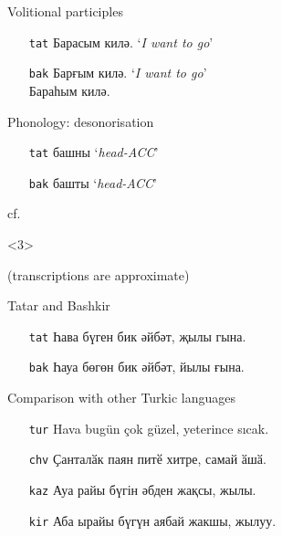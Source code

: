 \documentclass[10pt,xetex]{beamer} %
\begin{document}
\begin{frame}
\begin{onlyenv}
		\begin{block}{Volitional participles}
			\begin{itemize}
				\item[{\small {\tt tat}}] Барасым килә. `\textit{I want to go}'
				\item[{\small {\tt bak}}] Барғым килә. `\textit{I want to go}'\\
				Бараһым килә.
			\end{itemize}	
		\end{block}

		\begin{block}{Phonology: desonorisation}
			\begin{itemize}
				\item[{\small {\tt tat}}] башны `\textit{head-ACC}'
				\item[{\small {\tt bak}}] башты `\textit{head-ACC}'
			\end{itemize}	
			cf.\ \citet{washington10}
		\end{block}

  \end{onlyenv}
  \begin{onlyenv}<3>
  
	(transcriptions are approximate)
	\begin{block}{Tatar and Bashkir}
		\begin{itemize}
			\item[{\small {\tt tat}}] Һава бүген бик әйбәт, җылы гына.  \\
			{}
			\item[{\small {\tt bak}}] Һауа бөгөн бик әйбәт, йылы ғына. \\
			{}
		\end{itemize}
	\end{block}

	\begin{block}{Comparison with other Turkic languages}
		\begin{itemize}
			\item[{\small {\tt tur}}] Hava bugün çok güzel, yeterince sıcak. \\
			{}
			\item[{\small {\tt chv}}] Ҫанталӑк паян питӗ хитре, самай ӑшӑ. \\
			{}
			\item[{\small {\tt kaz}}] Ауа райы бүгін әбден жақсы, жылы. \\
			{}
			\item[{\small {\tt kir}}] Аба ырайы бүгүн аябай жакшы, жылуу. \\
			{}
		\end{itemize}
	\end{block}
  
  \end{onlyenv}
  
\end{frame}
\end{document}
